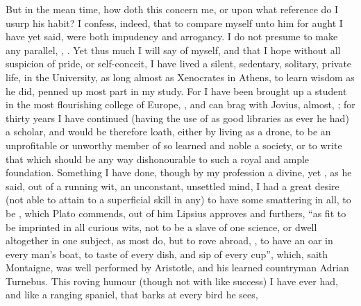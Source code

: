 But in the mean time, how doth this concern me, or upon what reference do I
usurp his habit? I confess, indeed, that to compare myself unto him for aught I
have yet said, were both impudency and arrogancy. I do not presume to make any
parallel, , .
Yet thus much I will say of myself, and that I hope without all suspicion of
pride, or self-conceit, I have lived a silent, sedentary, solitary, private
life,  in the University, as long
almost as Xenocrates in Athens, 
to learn wisdom as he did, penned up most part in my study. For I have been
brought up a student in the most flourishing college of Europe,
, and can brag with
Jovius, almost, ; for thirty years I have continued (having the use of as good
libraries as ever he had) a scholar, and would be therefore
loath, either by living as a drone, to be an unprofitable or unworthy member of
so learned and noble a society, or to write that which should be any way
dishonourable to such a royal and ample foundation. Something I have done,
though by my profession a divine, yet , as
he said, out of a running wit, an unconstant, unsettled
mind, I had a great desire (not able to attain to a superficial skill in any)
to have some smattering in all, to be , which Plato commends, out of
him Lipsius approves and furthers, \enquote{as fit to be imprinted
in all curious wits, not to be a slave of one science, or dwell altogether in
one subject, as most do, but to rove abroad, , to have an oar in every man's boat, to
taste of every dish, and sip of every cup}, which, saith
Montaigne, was well performed by Aristotle, and his learned
countryman Adrian Turnebus. This roving humour (though not with like success) I
have ever had, and like a ranging spaniel, that barks at every bird he sees,
